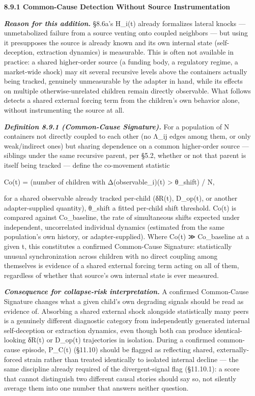 \documentclass[
]{article}
\begin{document}
\textbf{8.9.1 Common-Cause Detection Without Source Instrumentation}

\emph{\textbf{Reason for this addition.}} §8.6a's H\_i(t) already
formalizes lateral knocks --- unmetabolized failure from a source
venting onto coupled neighbors --- but using it presupposes the source
is already known and its own internal state (self-deception, extraction
dynamics) is measurable. This is often not available in practice: a
shared higher-order source (a funding body, a regulatory regime, a
market-wide shock) may sit several recursive levels above the containers
actually being tracked, genuinely unmeasurable by the adapter in hand,
while its effects on multiple otherwise-unrelated children remain
directly observable. What follows detects a shared external forcing term
from the children's own behavior alone, without instrumenting the source
at all.

\emph{\textbf{Definition 8.9.1 (Common-Cause Signature).}} For a
population of N containers not directly coupled to each other (no Λ\_ij
edges among them, or only weak/indirect ones) but sharing dependence on
a common higher-order source --- siblings under the same recursive
parent, per §5.2, whether or not that parent is itself being tracked ---
define the co-movement statistic

Co(t) = (number of children with Δ(observable\_i)(t) \textgreater{}
θ\_shift) / N,

for a shared observable already tracked per-child (δR(t), D\_op(t), or
another adapter-supplied quantity), θ\_shift a fitted per-child shift
threshold. Co(t) is compared against Co\_baseline, the rate of
simultaneous shifts expected under independent, uncorrelated individual
dynamics (estimated from the same population's own history, or
adapter-supplied). Where Co(t) ≫ Co\_baseline at a given t, this
constitutes a confirmed Common-Cause Signature: statistically unusual
synchronization across children with no direct coupling among themselves
is evidence of a shared external forcing term acting on all of them,
regardless of whether that source's own internal state is ever measured.

\emph{\textbf{Consequence for collapse-risk interpretation.}} A
confirmed Common-Cause Signature changes what a given child's own
degrading signals should be read as evidence of. Absorbing a shared
external shock alongside statistically many peers is a genuinely
different diagnostic category from independently generated internal
self-deception or extraction dynamics, even though both can produce
identical-looking δR(t) or D\_op(t) trajectories in isolation. During a
confirmed common-cause episode, P\_C(t) (§11.10) should be flagged as
reflecting shared, externally-forced strain rather than treated
identically to isolated internal decline --- the same discipline already
required of the divergent-signal flag (§11.10.1): a score that cannot
distinguish two different causal stories should say so, not silently
average them into one number that answers neither question.
\end{document}
